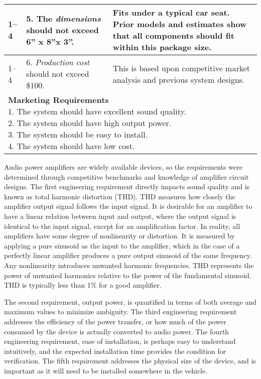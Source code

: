 \begin{longtable}{ |p{2.5cm}|p{5cm}|p{5.5cm}|}
1--4 & 
5.  The \emph{dimensions} should not exceed 6'' x 8''x 3''. &
Fits under a typical car seat. Prior models and
estimates show that all components should fit within this package
size. \\ \hline

1--4 & 
6.  \emph{Production cost} should not exceed \$100. &
This is based upon competitive market analysis and previous system designs. \\ \hline

\multicolumn{3}{|p{12cm}|}{
\textbf{Marketing Requirements}\newline
1.  The system should have excellent sound quality.\newline
2.  The system should have high output power.\newline
3.  The system should be easy to install.\newline
4.   The system should have low cost.
} \\ \hline
\end{longtable}

Audio power amplifiers are widely available devices, so the requirements
were determined through competitive benchmarks and knowledge of
amplifier circuit designs. The first engineering requirement directly
impacts sound quality and is known as total harmonic distortion (THD).
THD measures how closely the amplifier output signal follows the input
signal. It is desirable for an amplifier to have a linear relation
between input and output, where the output signal is identical to the
input signal, except for an amplification factor. In reality, all
amplifiers have some degree of nonlinearity or distortion. It is
measured by applying a pure sinusoid as the input to the amplifier,
which in the case of a perfectly linear amplifier produces a pure output
sinusoid of the same frequency. Any nonlinearity introduces unwanted
harmonic frequencies. THD represents the power of unwanted harmonics
relative to the power of the fundamental sinusoid. THD is typically less
than 1\% for a good amplifier.

The second requirement, output power, is quantified in terms of both
average and maximum values to minimize ambiguity. The third engineering
requirement addresses the efficiency of the power transfer, or how much
of the power consumed by the device is actually converted to audio
power. The fourth engineering requirement, ease of installation, is
perhaps easy to understand intuitively, and the expected installation
time provides the condition for verification. The fifth requirement
addresses the physical size of the device, and is important as it will
need to be installed somewhere in the vehicle.

